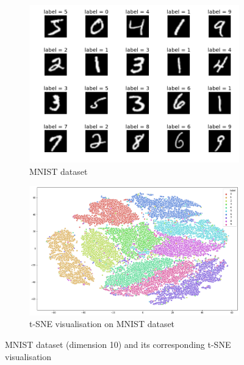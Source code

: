 \begin{enumerate}
          \begin{figure}[h]
              \centering
              \begin{subfigure}[b]{0.45\linewidth}
                  \centering
                  \includegraphics[width=\linewidth]{img/2_mnist.png}
                  \caption{MNIST dataset}
              \end{subfigure}
              \hfill %
              \begin{subfigure}[b]{0.45\linewidth}
                  \centering
                  \includegraphics[width=\linewidth]{img/2_mnist-tsne.png}
                  \caption{t-SNE visualisation on MNIST dataset}
                  \label{fig:mnist-tsne}
              \end{subfigure}
              \caption{{\footnotesize MNIST dataset (dimension 10) and its corresponding t-SNE visualisation}}
              \label{fig:mnist-tsne}
          \end{figure}




\end{enumerate}


